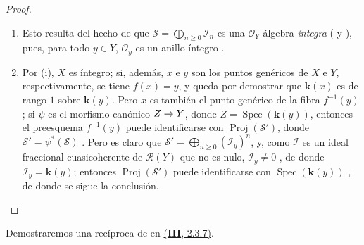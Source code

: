 \documentclass[oneside,10pt]{amsart}
\makeatletter
\renewcommand{\geq}{\geqslant}
\newcommand{\ega@arrow}[2]{\mathchoice{#1}{#2}{#2}{#2}}
\renewcommand{\to}{\ega@arrow{\longrightarrow}{\rightarrow}}
\makeatother
\begin{document}
\begin{proof}
\medskip\noindent
\begin{enumerate}
    \item[\rm{(i)}] Esto resulta del hecho de que $\mathcal{S}=\bigoplus_{n\geq0}\mathcal{I}_n$ es una $\mathcal{O}_Y$-álgebra \emph{íntegra} ( y ), pues, para todo $y\in Y$, $\mathcal{O}_y$ es un anillo íntegro .
    \item[\rm{(ii)}] Por (i), $X$ es íntegro; si, además, $x$ e $y$ son los puntos genéricos de $X$ e $Y$, respectivamente, se tiene $f(x)=y$, y queda por demostrar que $\boldsymbol{k}(x)$ es de rango $1$ sobre $\boldsymbol{k}(y)$.
        Pero $x$ es también el punto genérico de la fibra $f^{-1}(y)$; si $\psi$ es el morfismo canónico $Z\to Y$, donde $Z=\operatorname{Spec}(\boldsymbol{k}(y))$, entonces el preesquema $f^{-1}(y)$ puede identificarse con $\operatorname{Proj}(\mathcal{S}')$, donde $\mathcal{S}'=\psi^*(\mathcal{S})$ .
        Pero es claro que $\mathcal{S}'=\bigoplus_{n\geq0}(\mathcal{I}_y)^n$, y, como $\mathcal{I}$ es un ideal fraccional cuasicoherente de $\mathcal{R}(Y)$ que no es nulo, $\mathcal{I}_y\neq0$ , de donde $\mathcal{I}_y=\boldsymbol{k}(y)$;
        entonces $\operatorname{Proj}(\mathcal{S}')$ puede identificarse con $\operatorname{Spec}(\boldsymbol{k}(y))$ , de donde se sigue la conclusión.
\end{enumerate}
\end{proof}

Demostraremos una recíproca de  en \hyperref[III.2.3.7-fr]{\textup{(\textbf{III}, 2.3.7)}}.
\end{document}
